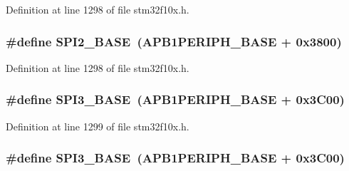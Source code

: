 Definition at line 1298 of file stm32f10x.\+h.

\subsubsection[{\texorpdfstring{S\+P\+I2\+\_\+\+B\+A\+SE}{SPI2_BASE}}]{\setlength{\rightskip}{0pt plus 5cm}\#define S\+P\+I2\+\_\+\+B\+A\+SE~({\bf A\+P\+B1\+P\+E\+R\+I\+P\+H\+\_\+\+B\+A\+SE} + 0x3800)}\hypertarget{group___peripheral__memory__map_gac3e357b4c25106ed375fb1affab6bb86}{}\label{group___peripheral__memory__map_gac3e357b4c25106ed375fb1affab6bb86}


Definition at line 1298 of file stm32f10x.\+h.

\subsubsection[{\texorpdfstring{S\+P\+I3\+\_\+\+B\+A\+SE}{SPI3_BASE}}]{\setlength{\rightskip}{0pt plus 5cm}\#define S\+P\+I3\+\_\+\+B\+A\+SE~({\bf A\+P\+B1\+P\+E\+R\+I\+P\+H\+\_\+\+B\+A\+SE} + 0x3\+C00)}\hypertarget{group___peripheral__memory__map_gae634fe8faa6922690e90fbec2fc86162}{}\label{group___peripheral__memory__map_gae634fe8faa6922690e90fbec2fc86162}


Definition at line 1299 of file stm32f10x.\+h.

\subsubsection[{\texorpdfstring{S\+P\+I3\+\_\+\+B\+A\+SE}{SPI3_BASE}}]{\setlength{\rightskip}{0pt plus 5cm}\#define S\+P\+I3\+\_\+\+B\+A\+SE~({\bf A\+P\+B1\+P\+E\+R\+I\+P\+H\+\_\+\+B\+A\+SE} + 0x3\+C00)}\hypertarget{group___peripheral__memory__map_gae634fe8faa6922690e90fbec2fc86162}{}\label{group___peripheral__memory__map_gae634fe8faa6922690e90fbec2fc86162}


